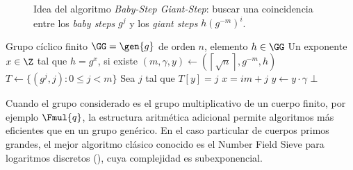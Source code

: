 \begin{figure}[ht]
	\centering
	\caption{Idea del algoritmo \textit{Baby-Step Giant-Step}: buscar una coincidencia entre los \textit{baby steps} $g^j$ y los \textit{giant steps} $h(g^{-m})^i$.}
	\label{fig:bsgs-intuition}
\end{figure}

\begin{algorithm}[h]
	\caption{Algoritmo Baby-Step Giant-Step para \DLP}
	\label{alg:bsgs-dlp}
	\begin{algorithmic}[1]
		\Require Grupo cíclico finito $\GG = \gen{g}$ de orden $n$, elemento $h \in \GG$
		\Ensure Un exponente $x \in \Z$ tal que $h = g^x$, si existe
		\State $(m, \gamma, y) \gets \left(\left\lceil \sqrt{n} \right\rceil, g^{-m}, h\right)$
		\State $T \gets \{(g^j, j): 0 \leq j < m\}$
				\State Sea $j$ tal que $T[y] = j$
				\State \Return $x = im + j$
			\EndIf
			\State $y \gets y \cdot \gamma$
		\EndFor
		\State \Return $\bot$
	\end{algorithmic}
\end{algorithm}

Cuando el grupo considerado es el grupo multiplicativo de un cuerpo finito, por ejemplo $\Fmul{q}$, la estructura aritmética adicional permite algoritmos más eficientes que en un grupo genérico. En el caso particular de cuerpos primos grandes, el mejor algoritmo clásico conocido es el Number Field Sieve para logaritmos discretos (\NFSDL), cuya complejidad es subexponencial.

